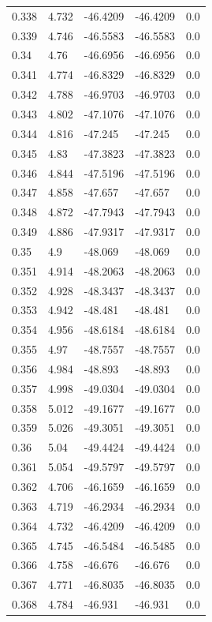 \begin{table}[H]
\begin{tabular}{lllll}
0.338 & 4.732 & -46.4209 & -46.4209 & 0.0 \\
0.339 & 4.746 & -46.5583 & -46.5583 & 0.0 \\
0.34 & 4.76 & -46.6956 & -46.6956 & 0.0 \\
0.341 & 4.774 & -46.8329 & -46.8329 & 0.0 \\
0.342 & 4.788 & -46.9703 & -46.9703 & 0.0 \\
0.343 & 4.802 & -47.1076 & -47.1076 & 0.0 \\
0.344 & 4.816 & -47.245 & -47.245 & 0.0 \\
0.345 & 4.83 & -47.3823 & -47.3823 & 0.0 \\
0.346 & 4.844 & -47.5196 & -47.5196 & 0.0 \\
0.347 & 4.858 & -47.657 & -47.657 & 0.0 \\
0.348 & 4.872 & -47.7943 & -47.7943 & 0.0 \\
0.349 & 4.886 & -47.9317 & -47.9317 & 0.0 \\
0.35 & 4.9 & -48.069 & -48.069 & 0.0 \\
0.351 & 4.914 & -48.2063 & -48.2063 & 0.0 \\
0.352 & 4.928 & -48.3437 & -48.3437 & 0.0 \\
0.353 & 4.942 & -48.481 & -48.481 & 0.0 \\
0.354 & 4.956 & -48.6184 & -48.6184 & 0.0 \\
0.355 & 4.97 & -48.7557 & -48.7557 & 0.0 \\
0.356 & 4.984 & -48.893 & -48.893 & 0.0 \\
0.357 & 4.998 & -49.0304 & -49.0304 & 0.0 \\
0.358 & 5.012 & -49.1677 & -49.1677 & 0.0 \\
0.359 & 5.026 & -49.3051 & -49.3051 & 0.0 \\
0.36 & 5.04 & -49.4424 & -49.4424 & 0.0 \\
0.361 & 5.054 & -49.5797 & -49.5797 & 0.0 \\
0.362 & 4.706 & -46.1659 & -46.1659 & 0.0 \\
0.363 & 4.719 & -46.2934 & -46.2934 & 0.0 \\
0.364 & 4.732 & -46.4209 & -46.4209 & 0.0 \\
0.365 & 4.745 & -46.5484 & -46.5485 & 0.0 \\
0.366 & 4.758 & -46.676 & -46.676 & 0.0 \\
0.367 & 4.771 & -46.8035 & -46.8035 & 0.0 \\
0.368 & 4.784 & -46.931 & -46.931 & 0.0 \\

\end{tabular}
\end{table}
